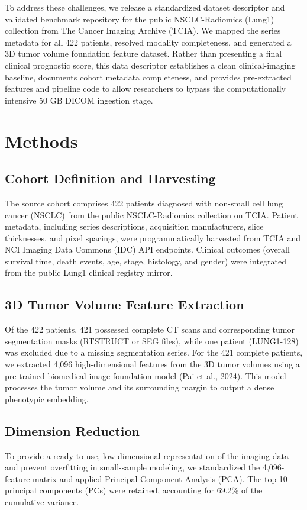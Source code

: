 \documentclass[11pt]{article}
\begin{document}
To address these challenges, we release a standardized dataset descriptor and validated benchmark repository for the public NSCLC-Radiomics (Lung1) collection from The Cancer Imaging Archive (TCIA). We mapped the series metadata for all 422 patients, resolved modality completeness, and generated a 3D tumor volume foundation feature dataset. Rather than presenting a final clinical prognostic score, this data descriptor establishes a clean clinical-imaging baseline, documents cohort metadata completeness, and provides pre-extracted features and pipeline code to allow researchers to bypass the computationally intensive 50 GB DICOM ingestion stage.

\section*{Methods}
\subsection*{Cohort Definition and Harvesting}
The source cohort comprises 422 patients diagnosed with non-small cell lung cancer (NSCLC) from the public NSCLC-Radiomics collection on TCIA. Patient metadata, including series descriptions, acquisition manufacturers, slice thicknesses, and pixel spacings, were programmatically harvested from TCIA and NCI Imaging Data Commons (IDC) API endpoints. Clinical outcomes (overall survival time, death events, age, stage, histology, and gender) were integrated from the public Lung1 clinical registry mirror.

\subsection*{3D Tumor Volume Feature Extraction}
Of the 422 patients, 421 possessed complete CT scans and corresponding tumor segmentation masks (RTSTRUCT or SEG files), while one patient (LUNG1-128) was excluded due to a missing segmentation series. For the 421 complete patients, we extracted 4,096 high-dimensional features from the 3D tumor volumes using a pre-trained biomedical image foundation model (Pai et al., 2024). This model processes the tumor volume and its surrounding margin to output a dense phenotypic embedding.

\subsection*{Dimension Reduction}
To provide a ready-to-use, low-dimensional representation of the imaging data and prevent overfitting in small-sample modeling, we standardized the 4,096-feature matrix and applied Principal Component Analysis (PCA). The top 10 principal components (PCs) were retained, accounting for 69.2\% of the cumulative variance.
\end{document}
